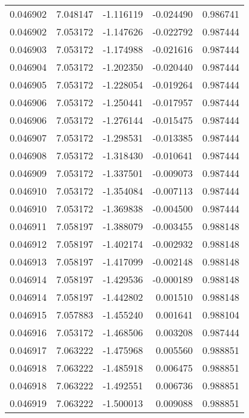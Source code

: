 \begin{tabular}{lrrrr}
0.046902    &  7.048147 & -1.116119 & -0.024490 &             0.986741 \\
0.046902    &  7.053172 & -1.147626 & -0.022792 &             0.987444 \\
0.046903    &  7.053172 & -1.174988 & -0.021616 &             0.987444 \\
0.046904    &  7.053172 & -1.202350 & -0.020440 &             0.987444 \\
0.046905    &  7.053172 & -1.228054 & -0.019264 &             0.987444 \\
0.046906    &  7.053172 & -1.250441 & -0.017957 &             0.987444 \\
0.046906    &  7.053172 & -1.276144 & -0.015475 &             0.987444 \\
0.046907    &  7.053172 & -1.298531 & -0.013385 &             0.987444 \\
0.046908    &  7.053172 & -1.318430 & -0.010641 &             0.987444 \\
0.046909    &  7.053172 & -1.337501 & -0.009073 &             0.987444 \\
0.046910    &  7.053172 & -1.354084 & -0.007113 &             0.987444 \\
0.046910    &  7.053172 & -1.369838 & -0.004500 &             0.987444 \\
0.046911    &  7.058197 & -1.388079 & -0.003455 &             0.988148 \\
0.046912    &  7.058197 & -1.402174 & -0.002932 &             0.988148 \\
0.046913    &  7.058197 & -1.417099 & -0.002148 &             0.988148 \\
0.046914    &  7.058197 & -1.429536 & -0.000189 &             0.988148 \\
0.046914    &  7.058197 & -1.442802 &  0.001510 &             0.988148 \\
0.046915    &  7.057883 & -1.455240 &  0.001641 &             0.988104 \\
0.046916    &  7.053172 & -1.468506 &  0.003208 &             0.987444 \\
0.046917    &  7.063222 & -1.475968 &  0.005560 &             0.988851 \\
0.046918    &  7.063222 & -1.485918 &  0.006475 &             0.988851 \\
0.046918    &  7.063222 & -1.492551 &  0.006736 &             0.988851 \\
0.046919    &  7.063222 & -1.500013 &  0.009088 &             0.988851 \\

\end{tabular}

